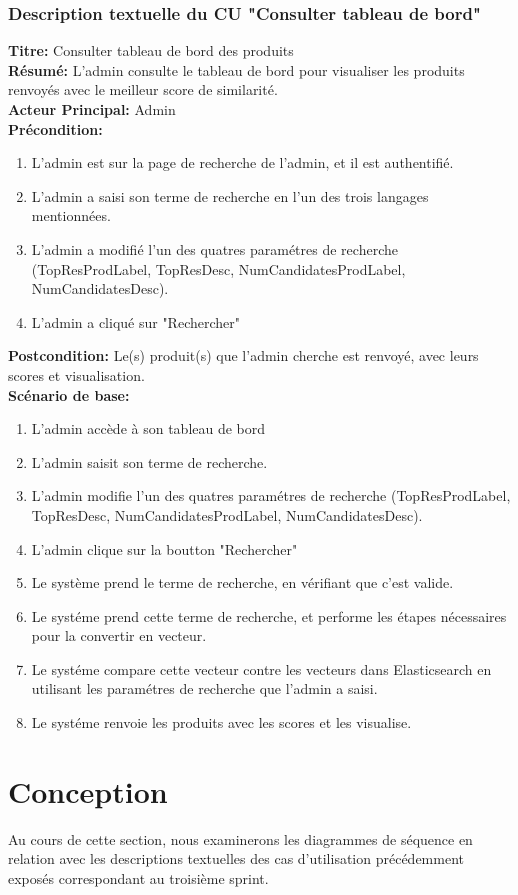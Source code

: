 \subsubsection{Description textuelle du CU "Consulter tableau de bord"}
\noindent
\textbf{Titre:} Consulter tableau de bord des produits \\
\textbf{Résumé:} L'admin consulte le tableau de bord pour visualiser les produits renvoyés avec le meilleur score de similarité. \\
\textbf{Acteur Principal:} Admin \\
\textbf{Précondition:} \begin{enumerate}
	\item L'admin est sur la page de recherche de l'admin, et il est authentifié.
	\item L'admin a saisi son terme de recherche en l'un des trois langages mentionnées.
	\item L'admin a modifié l'un des quatres paramétres de recherche (TopResProdLabel, TopResDesc, NumCandidatesProdLabel, NumCandidatesDesc).
	\item L'admin a cliqué sur "Rechercher"
\end{enumerate}
\textbf{Postcondition:} Le(s) produit(s) que l'admin cherche est renvoyé, avec leurs scores et visualisation. \\
\textbf{Scénario de base: }
\begin{enumerate}
	\item L'admin accède à son tableau de bord
	\item L'admin saisit son terme de recherche.
	\item L'admin modifie l'un des quatres paramétres de recherche (TopResProdLabel, TopResDesc, NumCandidatesProdLabel, NumCandidatesDesc).
	\item L'admin clique sur la boutton "Rechercher"
	\item Le système prend le terme de recherche, en vérifiant que c'est valide.
	\item Le systéme prend cette terme de recherche, et performe les étapes nécessaires pour la convertir en vecteur.
	\item Le systéme compare cette vecteur contre les vecteurs dans Elasticsearch en utilisant les paramétres de recherche que l'admin a saisi.
	\item Le systéme renvoie les produits avec les scores et les visualise.
\end{enumerate}

\newpage
\section{Conception}
\noindent
Au cours de cette section, nous examinerons les diagrammes de séquence en relation avec les descriptions textuelles des cas d'utilisation précédemment exposés correspondant au troisième sprint.

